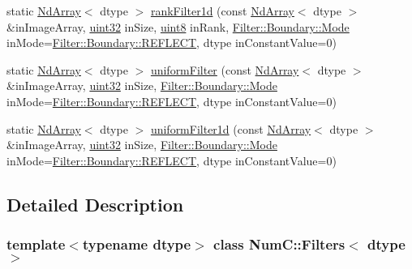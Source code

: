 \begin{DoxyCompactItemize}
\item 
static \mbox{\hyperlink{class_num_c_1_1_nd_array}{Nd\+Array}}$<$ dtype $>$ \mbox{\hyperlink{class_num_c_1_1_filters_afb73af9b240fe10dcaaf0659fa90bb4f}{rank\+Filter1d}} (const \mbox{\hyperlink{class_num_c_1_1_nd_array}{Nd\+Array}}$<$ dtype $>$ \&in\+Image\+Array, \mbox{\hyperlink{namespace_num_c_ae685802ca6d3035f2b400b081e3953fa}{uint32}} in\+Size, \mbox{\hyperlink{namespace_num_c_a60b2e2f49e1ff61059731c154e560869}{uint8}} in\+Rank, \mbox{\hyperlink{struct_num_c_1_1_filter_1_1_boundary_a20ccfbf059139a99eda623c1550a27e3}{Filter\+::\+Boundary\+::\+Mode}} in\+Mode=\mbox{\hyperlink{struct_num_c_1_1_filter_1_1_boundary_a20ccfbf059139a99eda623c1550a27e3a5571d98046aa858b5c79dce8c4c16c04}{Filter\+::\+Boundary\+::\+R\+E\+F\+L\+E\+CT}}, dtype in\+Constant\+Value=0)
\item 
static \mbox{\hyperlink{class_num_c_1_1_nd_array}{Nd\+Array}}$<$ dtype $>$ \mbox{\hyperlink{class_num_c_1_1_filters_a13da71bb1cc314679fbba4a23ea85134}{uniform\+Filter}} (const \mbox{\hyperlink{class_num_c_1_1_nd_array}{Nd\+Array}}$<$ dtype $>$ \&in\+Image\+Array, \mbox{\hyperlink{namespace_num_c_ae685802ca6d3035f2b400b081e3953fa}{uint32}} in\+Size, \mbox{\hyperlink{struct_num_c_1_1_filter_1_1_boundary_a20ccfbf059139a99eda623c1550a27e3}{Filter\+::\+Boundary\+::\+Mode}} in\+Mode=\mbox{\hyperlink{struct_num_c_1_1_filter_1_1_boundary_a20ccfbf059139a99eda623c1550a27e3a5571d98046aa858b5c79dce8c4c16c04}{Filter\+::\+Boundary\+::\+R\+E\+F\+L\+E\+CT}}, dtype in\+Constant\+Value=0)
\item 
static \mbox{\hyperlink{class_num_c_1_1_nd_array}{Nd\+Array}}$<$ dtype $>$ \mbox{\hyperlink{class_num_c_1_1_filters_a0d8f504b903901218ae7a843b96fefe1}{uniform\+Filter1d}} (const \mbox{\hyperlink{class_num_c_1_1_nd_array}{Nd\+Array}}$<$ dtype $>$ \&in\+Image\+Array, \mbox{\hyperlink{namespace_num_c_ae685802ca6d3035f2b400b081e3953fa}{uint32}} in\+Size, \mbox{\hyperlink{struct_num_c_1_1_filter_1_1_boundary_a20ccfbf059139a99eda623c1550a27e3}{Filter\+::\+Boundary\+::\+Mode}} in\+Mode=\mbox{\hyperlink{struct_num_c_1_1_filter_1_1_boundary_a20ccfbf059139a99eda623c1550a27e3a5571d98046aa858b5c79dce8c4c16c04}{Filter\+::\+Boundary\+::\+R\+E\+F\+L\+E\+CT}}, dtype in\+Constant\+Value=0)
\end{DoxyCompactItemize}


\subsection{Detailed Description}
\subsubsection*{template$<$typename dtype$>$\newline
class Num\+C\+::\+Filters$<$ dtype $>$}

